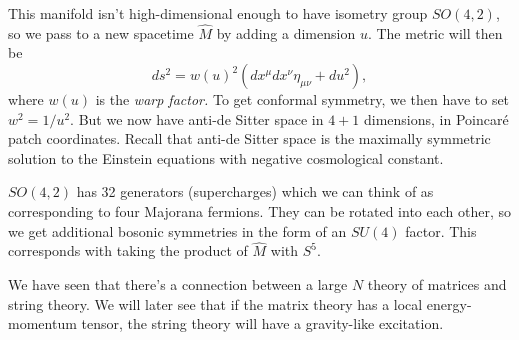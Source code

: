 This manifold isn't high-dimensional enough to have isometry group $SO(4,2)$, so we pass to a new spacetime $\hat M$ by adding a dimension $u$.
The metric will then be
\[
ds^2 = w(u)^2 \left( dx^\mu dx^\nu \eta_{\mu \nu} + du^2 \right),
\]
where $w(u)$ is the \emph{warp factor.}
To get conformal symmetry, we then have to set $w^2 = 1/u^2$.
But we now have anti-de Sitter space in $4+1$ dimensions, in Poincar\'e patch coordinates.
Recall that anti-de Sitter space is the maximally symmetric solution to the Einstein equations with negative cosmological constant.

$SO(4,2)$ has 32 generators (supercharges) which we can think of as corresponding to four Majorana fermions.
They can be rotated into each other, so we get additional bosonic symmetries in the form of an $SU(4)$ factor.
This corresponds with taking the product of $\hat M$ with $S^5$.

We have seen that there's a connection between a large $N$ theory of matrices and string theory.
We will later see that if the matrix theory has a local energy-momentum tensor, the string theory will have a gravity-like excitation.
